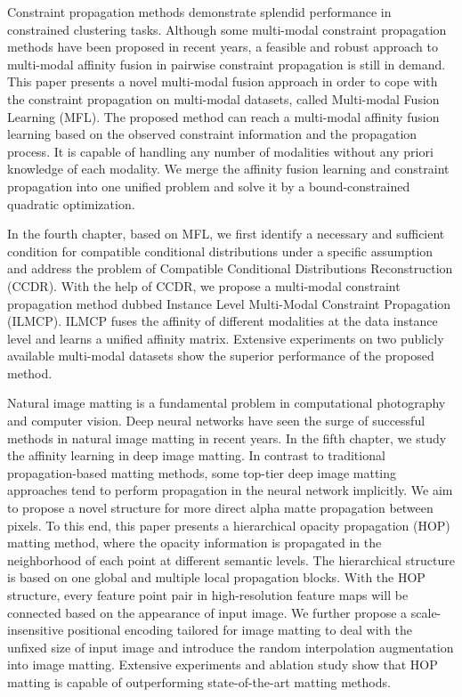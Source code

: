\begin{enabstract}
  Constraint propagation methods demonstrate splendid performance in constrained clustering tasks. Although some multi-modal constraint propagation methods have been proposed in recent years, a feasible and robust approach to multi-modal affinity fusion in pairwise constraint propagation is still in demand. This paper presents a novel multi-modal fusion approach in order to cope with the constraint propagation on multi-modal datasets, called Multi-modal Fusion Learning (MFL). The proposed method can reach a multi-modal affinity fusion learning based on the observed constraint information and the propagation process. It is capable of handling any number of modalities without any priori knowledge of each modality. We merge the affinity fusion learning and constraint propagation into one unified problem and solve it by a bound-constrained quadratic optimization.

  In the fourth chapter, based on MFL, we first identify a necessary and sufficient condition for compatible conditional distributions under a specific assumption and address the problem of Compatible Conditional Distributions Reconstruction (CCDR). With the help of CCDR, we propose a multi-modal constraint propagation method dubbed Instance Level Multi-Modal Constraint Propagation (ILMCP). ILMCP fuses the affinity of different modalities at the data instance level and learns a unified affinity matrix. Extensive experiments on two publicly available multi-modal datasets show the superior performance of the proposed method. 

  Natural image matting is a fundamental problem in computational photography and computer vision. Deep neural networks have seen the surge of successful methods in natural image matting in recent years. In the fifth chapter, we study the affinity learning in deep image matting. In contrast to traditional propagation-based matting methods, some top-tier deep image matting approaches tend to perform propagation in the neural network implicitly. We aim to propose a novel structure for more direct alpha matte propagation between pixels. To this end, this paper  presents a hierarchical opacity propagation (HOP) matting method, where the opacity information is propagated in the neighborhood of each point at different semantic levels. The hierarchical structure is based on one global and multiple local propagation blocks. With the HOP structure, every feature point pair in high-resolution feature maps will be connected based on the appearance of input image. We further propose a scale-insensitive positional encoding tailored for image matting to deal with the unfixed size of input image and introduce the random interpolation augmentation into image matting. Extensive experiments and ablation study show that HOP matting is capable of outperforming state-of-the-art matting methods.


\end{enabstract}
